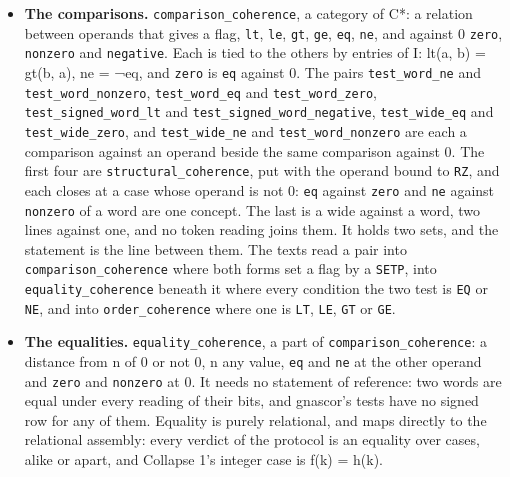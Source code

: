 \begin{itemize}
\item \textbf{The comparisons.} \texttt{comparison\_\allowbreak{}coherence}, a category of C*: a relation between operands that gives a flag, \texttt{lt}, \texttt{le}, \texttt{gt}, \texttt{ge}, \texttt{eq}, \texttt{ne}, and against 0 \texttt{zero}, \texttt{nonzero} and \texttt{negative}. Each is tied to the others by entries of I: lt(a, b) = gt(b, a), ne = ¬eq, and \texttt{zero} is \texttt{eq} against 0. The pairs \texttt{test\_\allowbreak{}word\_\allowbreak{}ne} and \texttt{test\_\allowbreak{}word\_\allowbreak{}nonzero}, \texttt{test\_\allowbreak{}word\_\allowbreak{}eq} and \texttt{test\_\allowbreak{}word\_\allowbreak{}zero}, \texttt{test\_\allowbreak{}signed\_\allowbreak{}word\_\allowbreak{}lt} and \texttt{test\_\allowbreak{}signed\_\allowbreak{}word\_\allowbreak{}negative}, \texttt{test\_\allowbreak{}wide\_\allowbreak{}eq} and \texttt{test\_\allowbreak{}wide\_\allowbreak{}zero}, and \texttt{test\_\allowbreak{}wide\_\allowbreak{}ne} and \texttt{test\_\allowbreak{}word\_\allowbreak{}nonzero} are each a comparison against an operand beside the same comparison against 0. The first four are \texttt{structural\_\allowbreak{}coherence}, put with the operand bound to \texttt{RZ}, and each closes at a case whose operand is not 0: \texttt{eq} against \texttt{zero} and \texttt{ne} against \texttt{nonzero} of a word are one concept. The last is a wide against a word, two lines against one, and no token reading joins them. It holds two sets, and the statement is the line between them. The texts read a pair into \texttt{comparison\_\allowbreak{}coherence} where both forms set a flag by a \texttt{SETP}, into \texttt{equality\_\allowbreak{}coherence} beneath it where every condition the two test is \texttt{EQ} or \texttt{NE}, and into \texttt{order\_\allowbreak{}coherence} where one is \texttt{LT}, \texttt{LE}, \texttt{GT} or \texttt{GE}.
\item \textbf{The equalities.} \texttt{equality\_\allowbreak{}coherence}, a part of \texttt{comparison\_\allowbreak{}coherence}: a distance from n of 0 or not 0, n any value, \texttt{eq} and \texttt{ne} at the other operand and \texttt{zero} and \texttt{nonzero} at 0. It needs no statement of reference: two words are equal under every reading of their bits, and gnascor's tests have no signed row for any of them. Equality is purely relational, and maps directly to the relational assembly: every verdict of the protocol is an equality over cases, alike or apart, and Collapse 1's integer case is f(k) = h(k).

\end{itemize}
